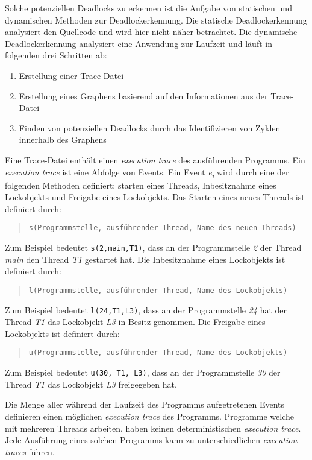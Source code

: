 Solche potenziellen Deadlocks zu erkennen ist die Aufgabe von statischen und
dynamischen Methoden zur Deadlockerkennung. Die statische Deadlockerkennung
analysiert den Quellcode und wird hier nicht näher betrachtet. Die dynamische
Deadlockerkennung analysiert eine Anwendung zur Laufzeit und läuft in folgenden
drei Schritten ab:
\begin{enumerate}
  \item Erstellung einer Trace-Datei
  \item Erstellung eines Graphens basierend auf den Informationen aus der
  Trace-Datei
  \item Finden von potenziellen Deadlocks durch das Identifizieren von Zyklen
  innerhalb des Graphens
\end{enumerate}

Eine Trace-Datei enthält einen \textit{execution trace} des ausführenden
Programms. Ein \textit{execution trace} ist eine Abfolge von Events. Ein Event
\textit{e\textsubscript{i}} wird durch eine der folgenden Methoden definiert:
starten eines Threads, Inbesitznahme eines Lockobjekts und Freigabe eines
Lockobjekts. Das Starten eines neues Threads ist definiert durch:
\begin{quote}
\texttt{s(Programmstelle, ausführender Thread, Name des neuen Threads)}
\end{quote}
Zum Beispiel bedeutet \texttt{s(2,main,T1)}, dass an der Programmstelle
\textit{2} der Thread \textit{main} den Thread \textit{T1} gestartet hat. 
Die Inbesitznahme eines Lockobjekts ist definiert durch:
\begin{quote}
\texttt{l(Programmstelle, ausführender Thread, Name des Lockobjekts)}
\end{quote}
Zum Beispiel bedeutet \texttt{l(24,T1,L3)}, dass
an der Programmstelle \textit{24} hat der Thread \textit{T1} das Lockobjekt
\textit{L3} in Besitz genommen. Die Freigabe eines Lockobjekts ist definiert
durch:
\begin{quote}
\texttt{u(Programmstelle, ausführender Thread, Name des Lockobjekts)}
\end{quote}
Zum Beispiel bedeutet \texttt{u(30, T1, L3)}, dass an der Programmstelle
\textit{30} der Thread \textit{T1} das Lockobjekt \textit{L3} freigegeben hat.

Die Menge aller während der Laufzeit des Programms aufgetretenen Events
definieren einen möglichen \textit{execution trace} des Programms.
Programme welche mit mehreren Threads arbeiten, haben keinen deterministischen
\textit{execution trace}. Jede Ausführung eines solchen Programms kann zu
unterschiedlichen \textit{execution traces} führen. 

